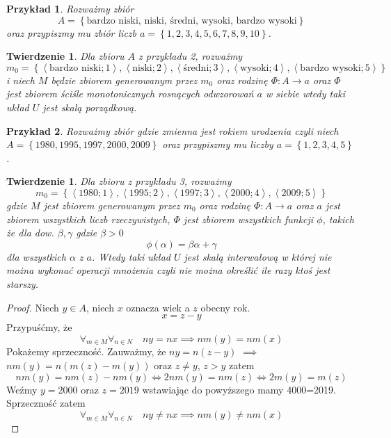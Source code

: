 \documentclass[12pt,a4paper]{report}
\newtheorem{przyklad}{Przykład}
\newtheorem{tw}[definition]{Twierdzenie}
\newcommand{\parauporzadkowana}[2]{\left\langle {#1}; {#2} \right\rangle}
\newcommand{\zbior}[1]{\left\lbrace {#1} \right\rbrace }
\begin{document}
\begin{przyklad}
Rozważmy zbiór 
$$
A=\zbior{\textrm{bardzo niski, niski, średni, wysoki, bardzo wysoki}}
$$
 oraz przypiszmy mu zbiór liczb  $a=\zbior{1,2,3,4,5,6,7,8,9,10}$. 
\end{przyklad}
\begin{tw}
Dla zbioru $A$ z przykładu 2, rozważmy 
$$
m_{0}=\zbior{\parauporzadkowana{\textrm{bardzo niski}}{1},\parauporzadkowana{\textrm{niski}}{2},\parauporzadkowana{\textrm{średni}}{3},\parauporzadkowana{\textrm{wysoki}}{4},\parauporzadkowana{\textrm{bardzo wysoki}}{5}}
$$
i niech $M$ będzie zbiorem generowanym przez $m_{0}$ oraz rodzinę $\Phi \colon A \to a$ oraz $\Phi$ jest zbiorem ściśle monotonicznych rosnących odwzorowań $a$ w siebie wtedy taki układ $U$ jest skalą porządkową.
\end{tw}

\begin{przyklad}
Rozważmy zbiór gdzie zmienna jest rokiem urodzenia czyli niech $A=\zbior{1980,1995,1997,2000,2009}$ oraz przypiszmy mu liczby $a=\zbior{1,2,3,4,5}$.
\end{przyklad}
\begin{tw}
Dla zbioru z przykładu 3, rozważmy 
$$
m_{0}=\zbior{\parauporzadkowana{1980}{1},\parauporzadkowana{1995}{2},\parauporzadkowana{1997}{3},\parauporzadkowana{2000}{4},\parauporzadkowana{2009}{5}}
$$
gdzie $M$ jest zbiorem generowanym przez $m_{0}$ oraz rodzinę $\Phi \colon A \to a$ oraz $a$ jest zbiorem wszystkich liczb rzeczywistych, $\Phi$ jest zbiorem wszystkich funkcji $\phi$, takich że dla dow. $\beta,\gamma$ gdzie $\beta>0$
\begin{equation*}
\phi(\alpha)=\beta\alpha+\gamma
\end{equation*}
dla wszystkich $\alpha$ z $a$. Wtedy taki układ $U$ jest skalą interwałową w której nie można wykonać operacji mnożenia czyli nie można określić ile razy ktoś jest starszy.
\end{tw}
\begin{proof}
Niech $y \in A$, niech $x$ oznacza wiek a $z$ obecny rok.
\begin{equation*}
x=z-y
\end{equation*}
Przypuśćmy, że 
\begin{equation*}
\forall_{m \in M} \forall_{n \in N}\quad ny=nx \implies nm(y)=nm(x)
\end{equation*}
Pokażemy sprzeczność. Zauważmy, że $ny=n(z-y)$ $\implies$ $nm(y)=n(m(z)-m(y))$ oraz $z \ne y$, $z>y$ zatem
\begin{equation*}
nm(y)=nm(z)-nm(y) \iff 2nm(y)=nm(z) \iff 2m(y)=m(z)
\end{equation*}
Weźmy $y=2000$ oraz $z=2019$ wstawiając do powyższego mamy 4000=2019. Sprzeczność zatem
\begin{equation*}
\forall_{m \in M} \forall_{n \in N}\quad ny\ne nx \implies nm(y)\ne nm(x)
\end{equation*}
\end{proof}
 
\end{document}
